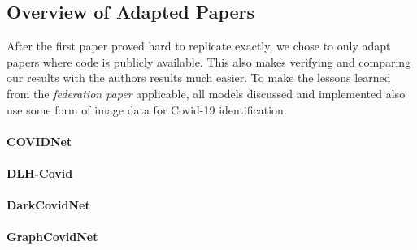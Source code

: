 \subsection{Overview of Adapted Papers}\label{subsec:methods_adapted_papers}
After the first paper proved hard to replicate exactly, we chose to only adapt papers where code is publicly available. This also makes verifying and comparing our results with the authors results much easier.
To make the lessons learned from the \textit{federation paper} applicable, all models discussed and implemented also use some form of image data for Covid-19 identification.

\paragraph{COVIDNet}
\paragraph{DLH-Covid}
\paragraph{DarkCovidNet}
\paragraph{GraphCovidNet}